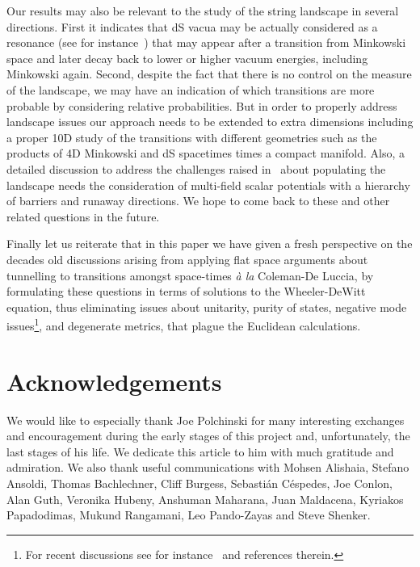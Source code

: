 \documentclass[11pt,a4paper]{article}
\begin{document}
Our results may also be relevant to the study of the string landscape in several directions. First it indicates that dS vacua may be actually considered as a resonance (see for instance~\cite{Freivogel:2004rd, Freivogel:2005vv, Maltz:2016iaw}) that may appear after a transition from Minkowski space and later decay back to lower or higher vacuum energies, including Minkowski again. Second, despite the fact that there is no control on the measure of the landscape, we may have an indication of which transitions are more probable by considering relative probabilities. But in order to properly address landscape issues our approach needs to be extended to extra dimensions including  a proper 10D study of the transitions with different geometries such as the products of 4D Minkowski and dS spacetimes times a compact manifold. Also, a detailed discussion to address the challenges raised in~\cite{Johnson:2008vn} about populating the landscape needs the consideration of multi-field scalar potentials with a hierarchy of barriers and runaway directions. We hope to come back to these and other related questions in the future.

Finally let us reiterate that in this paper we have given a fresh perspective on the decades old discussions arising from applying flat space arguments about tunnelling to transitions amongst space-times {\it à la} Coleman-De Luccia, by formulating these questions in terms of solutions to the Wheeler-DeWitt equation, thus eliminating issues about unitarity, purity of states, negative mode issues\footnote{For recent discussions see for instance~\cite{Bramberger, Gregory, Bramberger2} and references therein.}, and degenerate metrics, that plague the Euclidean calculations. 

\section*{Acknowledgements}
We would like to especially thank Joe Polchinski for many interesting exchanges and encouragement during the early stages of this project and, unfortunately, the last stages of his life. We dedicate this article to him with much gratitude and admiration. We also thank useful communications with Mohsen Alishaia, Stefano Ansoldi, Thomas Bachlechner, Cliff Burgess, Sebasti\'an C\'espedes, Joe Conlon, Alan Guth, Veronika Hubeny, Anshuman Maharana, Juan Maldacena, Kyriakos Papadodimas, Mukund Rangamani, Leo Pando-Zayas and Steve Shenker. 
\end{document}
